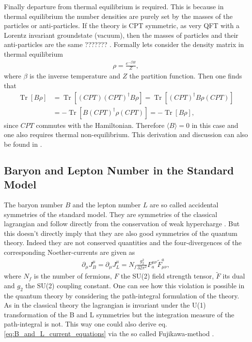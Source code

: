 \documentclass[13pt,a4paper,twoside,titlepage]{article}
\newcommand{\Tr}{\operatorname{Tr}}
\begin{document}
Finally departure from thermal equilibrium is required. This is because in thermal equilibrium the number densities are purely set by the
masses of the particles or anti-particles. If the theory is CPT symmetric, as very QFT with a Lorentz invariant groundstate (vacuum), then the
masses of particles and their anti-particles are the same ??????? .
Formally lets consider the density matrix in thermal equilibrium
\begin{align}
    \rho = \frac{e^{- \beta H}}{Z},
\end{align}
where $\beta$ is the inverse temperature and $Z$ the partition function.
Then one finds that
\begin{align}
    \Tr [ B \rho ] &=  \Tr [ (CPT) (CPT)^\dagger B \rho ] = \Tr [ (CPT)^\dagger B \rho (CPT) ]  \\
                   &= - \Tr [ B (CPT)^\dagger \rho (CPT) ] = - \Tr [ B \rho ],
\end{align}
since $CPT$ commutes with the Hamiltonian. Therefore $\langle B \rangle = 0$ in this case and one also requires thermal non-equilibrium. This derivation and discussion can also be found in \cite[sec. II]{Trodden:2004mj_baryogenesis_and_leptogenesis}.


\subsection{Baryon and Lepton Number in the Standard Model}
The baryon number $B$ and the lepton number $L$ are so called accidental
symmetries of the standard model. They are symmetries of the classical lagrangian
and follow directly from the conservation of weak hypercharge \cite[part II.B]{Trodden:2004mj_baryogenesis_and_leptogenesis}.
But this doesn't directly imply that they are also good symmetries of the
quantum theory. Indeed they are not conserved quantities and the four-divergences
of the corresponding Noether-currents are given as \cite[eq. 2.1]{Cline:2006ts_Baryogenesis}
\begin{align}
    \label{eq:B_and_L_current_equations}
    \partial_\mu J^\mu_B = \partial_\mu J^\mu_L = N_f \frac{g_2^2}{32 \pi^2} F^{\mu \nu}_a \tilde{F}_{\mu \nu}^a,
\end{align}
where $N_f$ is the number of fermions, $F$ the SU(2) field strength tensor, $\tilde{F}$ its dual and $g_2$ the SU(2) coupling constant.
One can see how this violation is possible in the quantum theory by considering the path-integral formulation of the theory.
As in the classical theory the lagrangian is invariant under the U(1) transformation of the B and L symmetries but the integration measure of the path-integral is not. This way one could also derive eq. \eqref{eq:B_and_L_current_equations} via the so called Fujikawa-method \cite{Fujikawa_method_PhysRevD.21.2848}.
\end{document}
